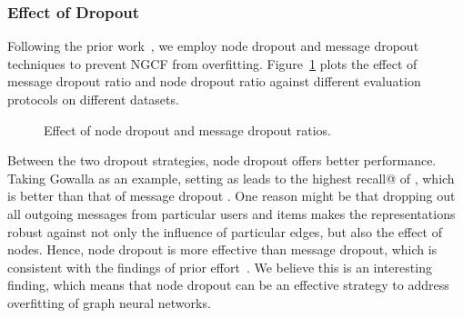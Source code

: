 \documentclass[sigconf]{acmart}
\theoremstyle{definition}
\begin{document}
\begin{table}[t]
\caption{Effect of graph convolution layers.
}
\vspace{-10px}
\label{tab:laplacian}
\vspace{-10px}
\end{table}




\subsubsection{\textbf{Effect of Dropout}}\label{sec:dropout}
Following the prior work~\cite{GC-MC}, we employ node dropout and message dropout techniques to prevent NGCF from overfitting.
Figure~\ref{fig:dropout} plots the effect of message dropout ratio  and node dropout ratio  against different evaluation protocols on different datasets.


\begin{figure}[t]
\centering
{}
\vspace{-10pt}
\caption{Effect of node dropout and message dropout ratios.
}
\label{fig:dropout}\vspace{-15pt}
\end{figure}

Between the two dropout strategies, node dropout offers better performance.
Taking Gowalla as an example, setting  as  leads to the highest recall@ of , which is better than that of message dropout .
One reason might be that dropping out all outgoing messages from particular users and items makes the representations robust against not only the influence of particular edges, but also the effect of nodes.
Hence, node dropout is more effective than message dropout, which is consistent with the findings of prior effort~\cite{GC-MC}.
We believe this is an interesting finding, which means that node dropout can be an effective strategy to address overfitting of graph neural networks.
\end{document}
